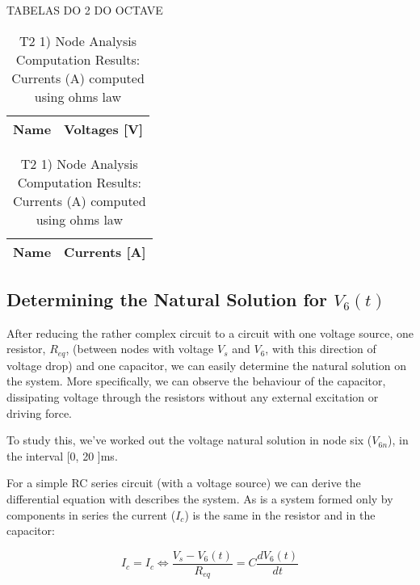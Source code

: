 TABELAS DO 2 DO OCTAVE

\begin{table}[h]
  \centering
  \begin{tabular}{|l|r|}
    \hline    
    {\bf Name} & {\bf Voltages [V]} \\ \hline
    
  \end{tabular}
  \caption{T2 1) Node Analysis Computation Results: Currents (A) computed using ohms law}
  \label{tab:nodeVoltages2}
\end{table}


\begin{table}[h]
  \centering
  \begin{tabular}{|l|r|}
    \hline    
    {\bf Name} & {\bf Currents [A]} \\ \hline
    
  \end{tabular}
  \caption{T2 1) Node Analysis Computation Results: Currents (A) computed using ohms law}
  \label{tab:nodeCurrents2}
\end{table}


\subsection{Determining the Natural Solution for $V_6(t)$}

After reducing the rather complex circuit to a circuit with one voltage source, one resistor, $R_{eq}$, (between nodes with voltage $V_s$ and $V_6$, with this direction of voltage drop) and one capacitor, we can easily determine the natural solution on the system. More specifically, we can observe the behaviour of the capacitor, dissipating voltage through the resistors without any external excitation or driving force. 

To study this, we've worked out the voltage natural solution in node six ($V_{6n}$), in the interval [0, 20 ]ms.

For a simple RC series circuit (with a voltage source) we can derive  the differential equation with describes the system. As is a system formed only by components in series the current ($I_c$) is the same in the resistor and in the capacitor: 

\begin{center}
  \begin{equation}
    I_c = I_c \Leftrightarrow \frac{V_s-V_6(t)}{R_{eq}} = C\frac{dV_6(t)}{dt}
  \end{equation} 
\end{center}


